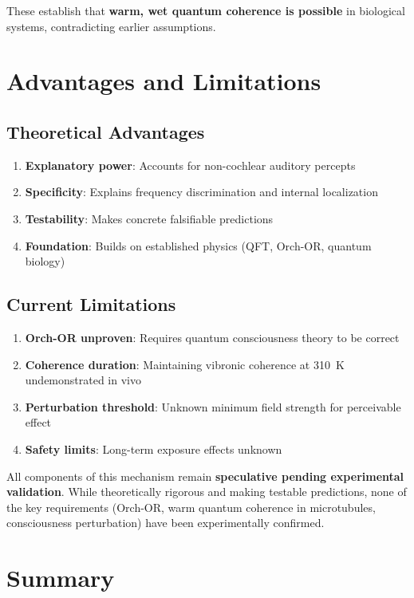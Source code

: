 These establish that \textbf{warm, wet quantum coherence is possible} in biological systems, contradicting earlier assumptions.

\section{Advantages and Limitations}

\subsection*{Theoretical Advantages}
\begin{enumerate}
\item \textbf{Explanatory power}: Accounts for non-cochlear auditory percepts
\item \textbf{Specificity}: Explains frequency discrimination and internal localization
\item \textbf{Testability}: Makes concrete falsifiable predictions
\item \textbf{Foundation}: Builds on established physics (QFT, Orch-OR, quantum biology)
\end{enumerate}

\subsection*{Current Limitations}
\begin{enumerate}
\item \textbf{Orch-OR unproven}: Requires quantum consciousness theory to be correct
\item \textbf{Coherence duration}: Maintaining vibronic coherence at 310~K undemonstrated in vivo
\item \textbf{Perturbation threshold}: Unknown minimum field strength for perceivable effect
\item \textbf{Safety limits}: Long-term exposure effects unknown
\end{enumerate}

\begin{warningbox}
All components of this mechanism remain \textbf{speculative pending experimental validation}. While theoretically rigorous and making testable predictions, none of the key requirements (Orch-OR, warm quantum coherence in microtubules, consciousness perturbation) have been experimentally confirmed.
\end{warningbox}

\section{Summary}


